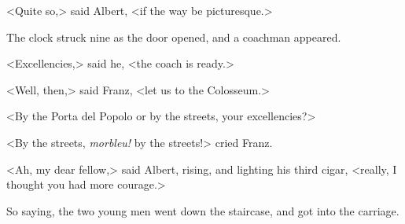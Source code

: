  <Quite so,> said Albert, <if the way be picturesque.> 

 The clock struck nine as the door opened, and a coachman appeared. 

 <Excellencies,> said he, <the coach is ready.> 

 <Well, then,> said Franz, <let us to the Colosseum.> 

 <By the Porta del Popolo or by the streets, your excellencies?> 

 <By the streets, \textit{morbleu!} by the streets!> cried Franz. 

 <Ah, my dear fellow,> said Albert, rising, and lighting his third cigar, <really, I thought you had more courage.> 

 So saying, the two young men went down the staircase, and got into the carriage.